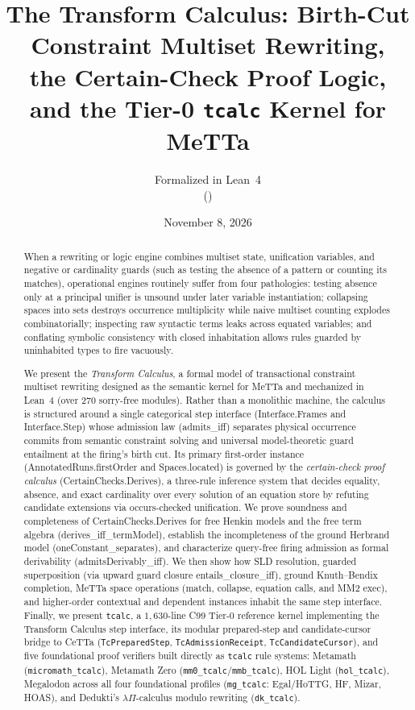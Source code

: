 \documentclass[11pt,a4paper]{article}
\title{\textbf{The Transform Calculus: Birth-Cut Constraint Multiset Rewriting,\\the Certain-Check Proof Logic, and the Tier-0 \texttt{tcalc} Kernel for MeTTa}}
\author{Formalized in Lean~4\\(\lean{Mettapedia.Languages.ProcessCalculi.ConstraintMultisetRewriting})}
\date{November 8, 2026}
\theoremstyle{definition}
\DeclareRobustCommand{\lean}[1]{%
  \ifmmode\text{\normalfont\ttfamily\footnotesize\detokenize{#1}}%
  \else{\normalfont\footnotesize\leanurl{#1}}\fi}
\DeclareRobustCommand{\metta}[1]{\text{\normalfont\ttfamily\footnotesize #1}}
\def\lean#1{#1}%
\def\metta#1{#1}%
\begin{document}
\sloppy
\maketitle

\begin{abstract}
When a rewriting or logic engine combines multiset state, unification variables, and negative or cardinality guards (such as testing the absence of a pattern or counting its matches), operational engines routinely suffer from four pathologies: testing absence only at a principal unifier is unsound under later variable instantiation; collapsing spaces into sets destroys occurrence multiplicity while naive multiset counting explodes combinatorially; inspecting raw syntactic terms leaks across equated variables; and conflating symbolic consistency with closed inhabitation allows rules guarded by uninhabited types to fire vacuously.

We present the \emph{Transform Calculus}, a formal model of transactional constraint multiset rewriting designed as the semantic kernel for MeTTa and mechanized in Lean~4 (over $270$ sorry-free modules). Rather than a monolithic machine, the calculus is structured around a single categorical step interface (\lean{Interface.Frames} and \lean{Interface.Step}) whose admission law (\lean{admits_iff}) separates physical occurrence commits from semantic constraint solving and universal model-theoretic guard entailment at the firing's birth cut. Its primary first-order instance (\lean{AnnotatedRuns.firstOrder} and \lean{Spaces.located}) is governed by the \emph{certain-check proof calculus} (\lean{CertainChecks.Derives}), a three-rule inference system that decides equality, absence, and exact cardinality over every solution of an equation store by refuting candidate extensions via occurs-checked unification. We prove soundness and completeness of \lean{CertainChecks.Derives} for free Henkin models and the free term algebra (\lean{derives_iff_termModel}), establish the incompleteness of the ground Herbrand model (\lean{oneConstant_separates}), and characterize query-free firing admission as formal derivability (\lean{admitsDerivably_iff}). We then show how SLD resolution, guarded superposition (via upward guard closure \lean{entails_closure_iff}), ground Knuth--Bendix completion, MeTTa space operations (\metta{match}, \metta{collapse}, equation calls, and MM2 \metta{exec}), and higher-order contextual and dependent instances inhabit the same step interface. Finally, we present \texttt{tcalc}, a $1{,}630$-line C99 Tier-0 reference kernel implementing the Transform Calculus step interface, its modular prepared-step and candidate-cursor bridge to CeTTa (\texttt{TcPreparedStep}, \texttt{TcAdmissionReceipt}, \texttt{TcCandidateCursor}), and five foundational proof verifiers built directly as \texttt{tcalc} rule systems: Metamath (\texttt{micromath\_tcalc}), Metamath Zero (\texttt{mm0\_tcalc}/\texttt{mmb\_tcalc}), HOL Light (\texttt{hol\_tcalc}), Megalodon across all four foundational profiles (\texttt{mg\_tcalc}: Egal/HoTTG, HF, Mizar, HOAS), and Dedukti's $\lambda\Pi$-calculus modulo rewriting (\texttt{dk\_tcalc}).
\end{abstract}
\end{document}
